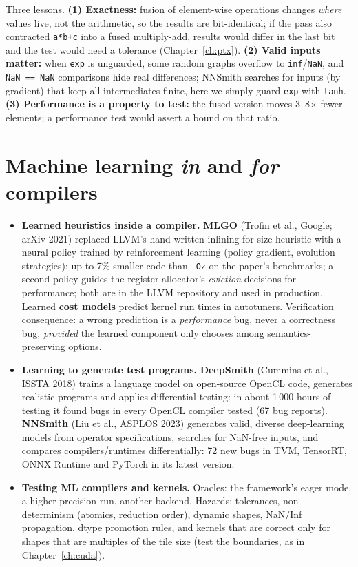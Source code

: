 \documentclass[10pt,a4paper,openany,oneside]{report}
\newcommand{\prio}[1]{\texorpdfstring{\ifcase#1\or{\color{gold}\ding{72}}\or{\color{gold}\ding{72}\ding{72}}\or{\color{gold}\ding{72}\ding{72}\ding{72}}\fi}{}}
\begin{document}
Three lessons. \textbf{(1) Exactness:} fusion of element-wise operations changes \emph{where} values live, not the arithmetic, so the results are bit-identical; if the pass also contracted \texttt{a*b+c} into a fused multiply-add, results would differ in the last bit and the test would need a tolerance (Chapter~\ref{ch:ptx}). \textbf{(2) Valid inputs matter:} when \texttt{exp} is unguarded, some random graphs overflow to \texttt{inf}/\texttt{NaN}, and \texttt{NaN == NaN} comparisons hide real differences; NNSmith searches for inputs (by gradient) that keep all intermediates finite, here we simply guard \texttt{exp} with \texttt{tanh}. \textbf{(3) Performance is a property to test:} the fused version moves 3--8$\times$ fewer elements; a performance test would assert a bound on that ratio.

\section{Machine learning \emph{in} and \emph{for} compilers \prio{2}}
\begin{itemize}[nosep]
\item \textbf{Learned heuristics inside a compiler.} \textbf{MLGO} (Trofin et al., Google; arXiv 2021) replaced LLVM's hand-written inlining-for-size heuristic with a neural policy trained by reinforcement learning (policy gradient, evolution strategies): up to 7\% smaller code than \texttt{-Oz} on the paper's benchmarks; a second policy guides the register allocator's \emph{eviction} decisions for performance; both are in the LLVM repository and used in production. Learned \textbf{cost models} predict kernel run times in autotuners. Verification consequence: a wrong prediction is a \emph{performance} bug, never a correctness bug, \emph{provided} the learned component only chooses among semantics-preserving options.
\item \textbf{Learning to generate test programs.} \textbf{DeepSmith} (Cummins et al., ISSTA 2018) trains a language model on open-source OpenCL code, generates realistic programs and applies differential testing: in about 1\,000 hours of testing it found bugs in every OpenCL compiler tested (67 bug reports). \textbf{NNSmith} (Liu et al., ASPLOS 2023) generates valid, diverse deep-learning models from operator specifications, searches for NaN-free inputs, and compares compilers/runtimes differentially: 72 new bugs in TVM, TensorRT, ONNX Runtime and PyTorch in its latest version.
\item \textbf{Testing ML compilers and kernels.} Oracles: the framework's eager mode, a higher-precision run, another backend. Hazards: tolerances, non-determinism (atomics, reduction order), dynamic shapes, NaN/Inf propagation, dtype promotion rules, and kernels that are correct only for shapes that are multiples of the tile size (test the boundaries, as in Chapter~\ref{ch:cuda}).
\end{itemize}
\end{document}
